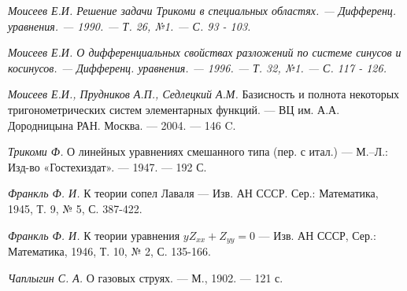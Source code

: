 ﻿\documentclass[oneside, final, 14pt]{extreport}
\begin{document}
\begin{thebibliography}{30}
	\it{ Моисеев Е.И.} Решение задачи Трикоми в специальных областях. —
	Дифференц. уравнения. — 1990. — Т. 26, №1. — С. 93 - 103.

	\it{ Моисеев Е.И.} О дифференциальных свойствах разложений по системе синусов и косинусов. —
	Дифференц. уравнения. — 1996. — Т. 32, №1. — С. 117 - 126.
	
	{\it Моисеев Е.И., Прудников А.П., Седлецкий А.М.} Базисность и полнота некоторых тригонометрических систем элементарных функций. —
	ВЦ им. А.А. Дородницына РАН. Москва. — 2004. — 146 C.
	
	{\it Трикоми Ф.} О линейных уравнениях смешанного типа (пер. с итал.) —
	М.–Л.: Изд-во «Гостехиздат». — 1947. — 192 С.
	
	{\it Франкль Ф. И.} К теории сопел Лаваля —
	Изв. АН СССР. Сер.: Математика, 1945, Т. 9, № 5, С. 387-422.
	
	{\it Франкль Ф. И.} К теории уравнения $yZ_{xx} + Z_{yy} = 0$ —
	Изв. АН СССР, Сер.: Математика, 1946, Т. 10, № 2, С. 135-166.
	
	{\it Чаплыгин С. А.}  О газовых струях. — М., 1902. — 121 с.
	
\end{thebibliography}
\end{document}
